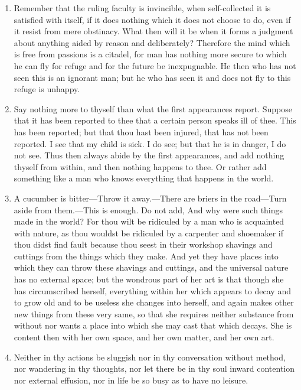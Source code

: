 \begin{enumerate}
\item Remember that the ruling faculty is invincible, when self-collected it is satisfied with itself, if it does nothing which it does not choose to do, even if it resist from mere obstinacy. What then will it be when it forms a judgment about anything aided by reason and deliberately? Therefore the mind which is free from passions is a citadel, for man has nothing more secure to which he can fly for refuge and for the future be inexpugnable. He then who has not seen this is an ignorant man; but he who has seen it and does not fly to this refuge is unhappy.

\item Say nothing more to thyself than what the first appearances report. Suppose that it has been reported to thee that a certain person speaks ill of thee. This has been reported; but that thou hast been injured, that has not been reported. I see that my child is sick. I do see; but that he is in danger, I do not see. Thus then always abide by the first appearances, and add nothing thyself from within, and then nothing happens to thee. Or rather add something like a man who knows everything that happens in the world.

\item A cucumber is bitter—Throw it away.—There are briers in the road—Turn aside from them.—This is enough. Do not add, And why were such things made in the world? For thou wilt be ridiculed by a man who is acquainted with nature, as thou wouldst be ridiculed by a carpenter and shoemaker if thou didst find fault because thou seest in their workshop shavings and cuttings from the things which they make. And yet they have places into which they can throw these shavings and cuttings, and the universal nature has no external space; but the wondrous part of her art is that though she has circumscribed herself, everything within her which appears to decay and to grow old and to be useless she changes into herself, and again makes other new things from these very same, so that she requires neither substance from without nor wants a place into which she may cast that which decays. She is content then with her own space, and her own matter, and her own art.

\item Neither in thy actions be sluggish nor in thy conversation without method, nor wandering in thy thoughts, nor let there be in thy soul inward contention nor external effusion, nor in life be so busy as to have no leisure.


\end{enumerate}

